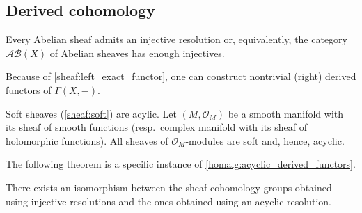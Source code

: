 
\subsection{Derived cohomology}

    \begin{property}
        Every Abelian sheaf admits an injective resolution or, equivalently, the category $\mathcal{AB}(X)$ of Abelian sheaves has enough injectives.
    \end{property}

    Because of \cref{sheaf:left_exact_functor}, one can construct nontrivial (right) derived functors of $\Gamma(X,-)$.

    \begin{example}\label{sheaf:example_soft}
        Soft sheaves (\cref{sheaf:soft}) are acylic. Let $(M,\mathcal{O}_M)$ be a smooth manifold with its sheaf of smooth functions (resp.~complex manifold with its sheaf of holomorphic functions). All sheaves of $\mathcal{O}_M$-modules are soft and, hence, acyclic.
    \end{example}

    The following theorem is a specific instance of \cref{homalg:acyclic_derived_functors}.
    \begin{theorem}
        There exists an isomorphism between the sheaf cohomology groups obtained using injective resolutions and the ones obtained using an acyclic resolution.
    \end{theorem}

